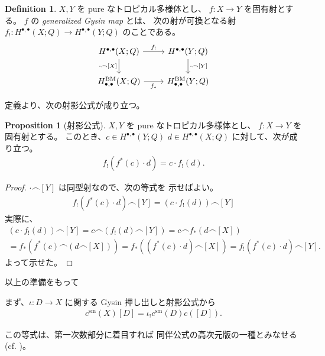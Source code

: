 \documentclass[a4paper,dvipdfmx,reqno,12pt]{amsart}
\theoremstyle{definition}
\newtheorem{definition}[theorem]{Definition}
\newtheorem{proposition}[theorem]{Proposition}
\numberwithin{equation}{section}
\begin{document}
\begin{definition}
$X,Y$ を pure なトロピカル多様体とし、
$f\colon X\to Y$ を固有射とする。
$f$ の \emph{generalized Gysin map} とは、
次の射が可換となる射
$f_!\colon H^{\bullet,\bullet}(X;Q)\to 
H^{\bullet,\bullet}(Y;Q)$
のことである。
\begin{equation}
\begin{tikzcd}
	{H^{\bullet,\bullet}(X;Q)} & {H^{\bullet,\bullet}(Y;Q)} \\
	{H_{\bullet,\bullet}^{\mathrm{BM}}(X;Q)} & {H_{\bullet,\bullet}^{\mathrm{BM}}(Y;Q)}
	\arrow["{\cdot \frown [X]}"', from=1-1, to=2-1]
	\arrow["{\cdot\frown[Y]}", from=1-2, to=2-2]
	\arrow["{f_*}"', from=2-1, to=2-2]
	\arrow["{f_!}", from=1-1, to=1-2]
\end{tikzcd}    
\end{equation}

\end{definition}
定義より、次の射影公式が成り立つ。
\begin{proposition}[{射影公式}]
$X,Y$ を pure なトロピカル多様体とし、
$f\colon X\to Y$ を固有射とする。
このとき、$c\in H^{\bullet,\bullet}(Y;Q) $
$d\in H^{\bullet,\bullet}(X;Q)$
に対して、次が成り立つ。
\begin{align}
    f_!(f^{*}(c)\cdot d)=c\cdot f_!(d).
\end{align}

\end{proposition}

\begin{proof}
$\cdot \frown [Y]$ は同型射なので、次の等式を
示せばよい。
\begin{align}
    f_!(f^{*}(c)\cdot d)\frown [Y]=(c\cdot f_!(d))\frown [Y]
\end{align}
実際に、
\begin{align}
(c\cdot f_!(d))\frown [Y]=
c\frown(f_!(d)\frown [Y])=
c\frown f_*(d\frown [X])\\
=f_*(f^*(c)\frown (d\frown [X]))=
f_*((f^*(c)\cdot d) \frown [X])
=f_!(f^{*}(c)\cdot d)\frown [Y].
\end{align}
よって示せた。
\end{proof}

以上の準備をもって

まず、$\iota\colon D\to X$ に関する
Gysin 押し出しと射影公式から
\begin{align}
c^{\mathrm{sm}}(X)[D]=\iota_!c^{\mathrm{sm}}(D)c([D]).
\end{align}

この等式は、第一次数部分に着目すれば
同伴公式の高次元版の一種とみなせる
(cf. \cite[Theorem 5.2]{demedrano2023chern})。
\end{document}
